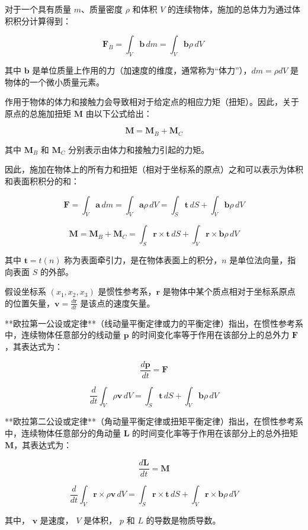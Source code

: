 对于一个具有质量 \( m \)、质量密度 \( \rho \) 和体积 \( V \) 的连续物体，施加的总体力为通过体积积分计算得到：

\[
\mathbf{F}_B = \int_V \mathbf{b} \, dm = \int_V \mathbf{b} \rho \, dV~
\]

其中 \( \mathbf{b} \) 是单位质量上作用的力（加速度的维度，通常称为“体力”），\( dm = \rho dV \) 是物体的一个微小质量元素。

作用于物体的体力和接触力会导致相对于给定点的相应力矩（扭矩）。因此，关于原点的总施加扭矩 \( \mathbf{M} \) 由以下公式给出：

\[
\mathbf{M} = \mathbf{M}_B + \mathbf{M}_C
\]

其中 \( \mathbf{M}_B \) 和 \( \mathbf{M}_C \) 分别表示由体力和接触力引起的力矩。

因此，施加在物体上的所有力和扭矩（相对于坐标系的原点）之和可以表示为体积和表面积积分的和：

\[
\mathbf{F} = \int_V \mathbf{a} \, dm = \int_V \mathbf{a} \rho \, dV = \int_S \mathbf{t} \, dS + \int_V \mathbf{b} \rho \, dV
\]

\[
\mathbf{M} = \mathbf{M}_B + \mathbf{M}_C = \int_S \mathbf{r} \times \mathbf{t} \, dS + \int_V \mathbf{r} \times \mathbf{b} \rho \, dV
\]

其中 \( \mathbf{t} = t(n) \) 称为表面牵引力，是在物体表面上的积分，\( n \) 是单位法向量，指向表面 \( S \) 的外部。

假设坐标系 \( (x_1, x_2, x_3) \) 是惯性参考系，\( \mathbf{r} \) 是物体中某个质点相对于坐标系原点的位置矢量，\( \mathbf{v} = \frac{d\mathbf{r}}{dt} \) 是该点的速度矢量。

**欧拉第一公设或定律**（线动量平衡定律或力的平衡定律）指出，在惯性参考系中，连续物体任意部分的线动量 \( \mathbf{p} \) 的时间变化率等于作用在该部分上的总外力 \( \mathbf{F} \)，其表达式为：

\[
\frac{d\mathbf{p}}{dt} = \mathbf{F}
\]

\[
\frac{d}{dt} \int_V \rho \mathbf{v} \, dV = \int_S \mathbf{t} \, dS + \int_V \mathbf{b} \rho \, dV
\]

**欧拉第二公设或定律**（角动量平衡定律或扭矩平衡定律）指出，在惯性参考系中，连续物体任意部分的角动量 \( \mathbf{L} \) 的时间变化率等于作用在该部分上的总外扭矩 \( \mathbf{M} \)，其表达式为：

\[
\frac{d\mathbf{L}}{dt} = \mathbf{M}
\]

\[
\frac{d}{dt} \int_V \mathbf{r} \times \rho \mathbf{v} \, dV = \int_S \mathbf{r} \times \mathbf{t} \, dS + \int_V \mathbf{r} \times \mathbf{b} \rho \, dV
\]

其中，  
\( \mathbf{v} \) 是速度，  
\( V \) 是体积，  
\( p \) 和 \( L \) 的导数是物质导数。